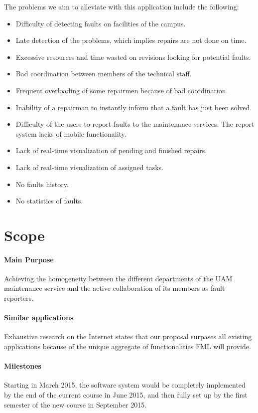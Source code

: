 \documentclass{report}
\begin{document}
The problems we aim to alleviate with this application include the following:


\begin{itemize}
\item Difficulty of detecting faults on facilities of the campus.
\item Late detection of the problems, which implies repairs are not done on time.
\item Excessive resources and time wasted on revisions looking for potential faults.
\item Bad coordination between members of the technical staff.
\item Frequent overloading of some repairmen because of bad coordination.
\item Inability of a repairman to instantly inform that a fault has just been solved.
\item Difficulty of the users to report faults to the maintenance services.
The report system lacks of mobile functionality.
\item Lack of real-time visualization of pending and finished repairs.
\item Lack of real-time visualization of assigned tasks.
\item No faults history.
\item No statistics of faults.
\end{itemize}

\section{Scope}

\paragraph{Main Purpose} Achieving the homogeneity between the different departments of the UAM maintenance service and the active collaboration of its members as fault reporters.

\paragraph{Similar applications} Exhaustive research on the Internet states that our proposal surpases all existing applications because of the unique aggregate of functionalities FML will provide.

\paragraph{Milestones} Starting in March 2015, the software system would be completely implemented by the end of the current course in June 2015, and then fully set up by the first semester of the new course in September 2015.
\end{document}
